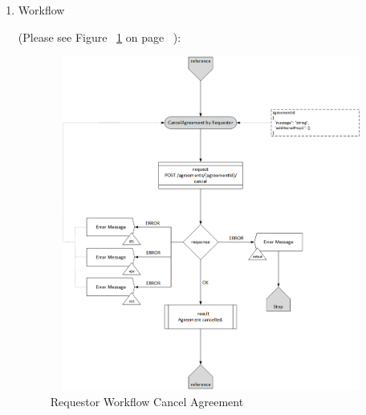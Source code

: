 \begin{enumerate}
\item Workflow

(Please see Figure ~\ref{fig:RCCA} on page ~\pageref{fig:RCCA}):

\begin{figure}[H]
    \centering
    \includegraphics[width=11cm,height=11cm,angle=0]{./diag/Workflow/Market/CancelAgreement-R-Workflow.png}
    \caption{Requestor Workflow Cancel Agreement  }
	\label{fig:RCCA}
\end{figure}

\end{enumerate}

\newpage



